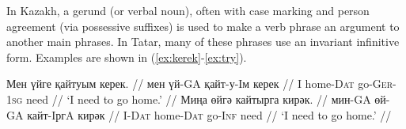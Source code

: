 \documentclass[a4paper,11pt]{article}
\newcommand{\gmk}[1]{{\qipb\scshape #1}}
\newcommand{\eng}[1]{`#1'}
\begin{document}
In Kazakh, a gerund (or verbal noun), often with case marking and person agreement (via possessive suffixes) is used to make a verb phrase an argument to another main phrases.  In Tatar, many of these phrases use an invariant infinitive form.  Examples are shown in (\ref{ex:kerek}-\ref{ex:try}).
\vspace{-1ex}
%



\pex[everygla=,everyglb=,everyglc=,aboveglbskip=0pt,aboveglftskip=0ex]  %
\vspace{-1ex}
\label{ex:kerek}
\begingl
\gla Мен үйге қайтуым керек. //
\glb мен үй-GA қайт-у-Iм керек //
\glb I home-\gmk{Dat} go-\gmk{Ger}-\gmk{1sg} need //
\glft \eng{I need to go home.} //
\endgl
\xe
\pex[everygla=,everyglb=,everyglc=,aboveglbskip=0pt,aboveglftskip=0ex]  %
\vspace{-1ex}
\begingl
\gla Миңа өйгә кайтырга кирәк. //
\glb мин-GA өй-GA кайт-IргA кирәк //
\glb I-\gmk{Dat} home-\gmk{Dat} go-\gmk{Inf} need //
\glft \eng{I need to go home.} //
\endgl
\xe
\end{document}
